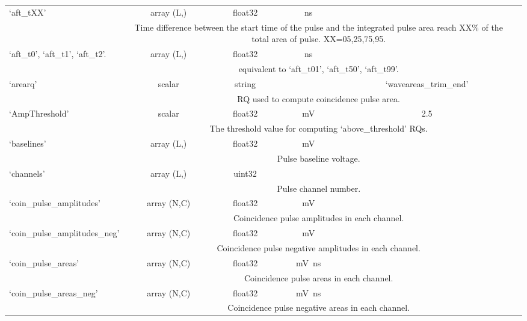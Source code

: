 \begin{center}
\begin{longtable}[!htbp]{|l||*{5}{c|}}
	 	`aft\_tXX'& array (L,) & float32 & \si{\ns} & \si{\nan} \\\cline{2-6} & \multicolumn{4}{m{27em}|}{Time difference between the start time of the pulse and the integrated pulse area reach XX\% of the total area of pulse. XX=05,25,75,95.}\\\hline
	 	`aft\_t0', `aft\_t1', `aft\_t2'. & array (L,) & float32 & \si{\ns} & \si{\nan} \\\cline{2-6} & \multicolumn{4}{m{27em}|}{equivalent to `aft\_t01', `aft\_t50', `aft\_t99'.}\\\hline
	 	`arearq' & scalar & string & & `waveareas\_trim\_end' \\\cline{2-6} & \multicolumn{4}{m{27em}|}{RQ used to compute coincidence pulse area.}\\\hline
	 	`AmpThreshold' & scalar & float32 & \si{\mV}  & 2.5 \\\cline{2-6} & \multicolumn{4}{m{27em}|}{The threshold value for computing `above\_threshold' RQs.}\\\hline
	 	`baselines' & array (L,) & float32 & \si{\mV} & \si{\nan} \\\cline{2-6} & \multicolumn{4}{m{27em}|}{Pulse baseline voltage. }\\\hline
	 	`channels' & array (L,) & uint32 & &  \\\cline{2-6} & \multicolumn{4}{m{27em}|}{Pulse channel number. }\\\hline
	 	`coin\_pulse\_amplitudes' & array (N,C) & float32 &\si{\mV}& \si{\nan} \\\cline{2-6} & \multicolumn{4}{m{27em}|}{Coincidence pulse amplitudes in each channel.}\\\hline
	 	`coin\_pulse\_amplitudes\_neg' & array (N,C) & float32 &\si{\mV}& \si{\nan} \\\cline{2-6} & \multicolumn{4}{m{27em}|}{Coincidence pulse negative amplitudes in each channel.}\\\hline
	 	`coin\_pulse\_areas' & array (N,C) & float32 &\si{\mV\ns}& \si{\nan} \\\cline{2-6} & \multicolumn{4}{m{27em}|}{Coincidence pulse areas in each channel.}\\\hline
	 	`coin\_pulse\_areas\_neg' & array (N,C) & float32 &\si{\mV\ns}& \si{\nan} \\\cline{2-6} & \multicolumn{4}{m{27em}|}{Coincidence pulse negative areas in each channel.}\\\hline

\end{longtable}
\end{center}
